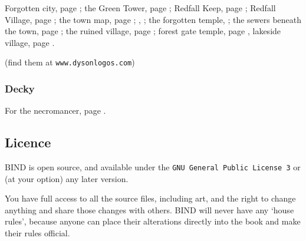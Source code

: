 \begin{multicols}{2}
Forgotten city, page \pageref{Dyson_Logos/forgotten_city};
the Green Tower, page \pageref{Dyson_Logos/green_tower};
Redfall Keep, page \pageref{Dyson_Logos/redfall_keep};
Redfall Village, page \pageref{Dyson_Logos/redfall};
the town map, page \pageref{Dyson_Logos/town};
, \pageref{Dyson_Logos/mincing_pig};
the forgotten temple, \pageref{Dyson_Logos/qualme_temple};
the sewers beneath the town, page \pageref{Dyson_Logos/sewer};
the ruined village, page \pageref{Dyson_Logos/ruined_village};
forest gate temple, page \pageref{Dyson_Logos/forest_gate},
lakeside village, page \pageref{Dyson_Logos/lakeside}.

(find them at {\tt www.dysonlogos.com})

\subsubsection{Decky}

For the necromancer, page \pageref{Decky/necromancer}.

\subsection*{Licence}

BIND is open source, and available under the {\tt GNU General Public License 3} or (at your option) any later version.

You have full access to all the source files, including art, and the right to change anything and share those changes with others.
BIND will never have any `house rules', because anyone can place their alterations directly into the book and make their rules official.

\end{multicols}

